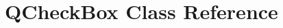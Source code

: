 \hypertarget{classGUI_1_1QCheckBox}{}\section{Q\+Check\+Box Class Reference}
\label{classGUI_1_1QCheckBox}
